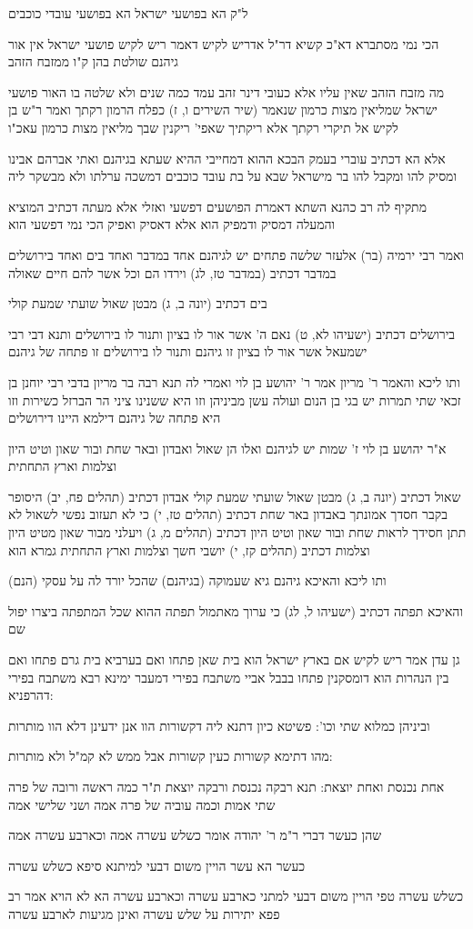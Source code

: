 \documentclass[12pt, openany]{book}
\newcommand{\sethebfont}{
\fontsize{10.5pt}{21.0pt} \selectfont
}
\newcommand{\textblock}[1]{
{\sethebfont #1\\}	
}
\begin{document}
\textblock{ל"ק הא בפושעי ישראל הא בפושעי עובדי כוכבים}
\textblock{הכי נמי מסתברא דא"כ קשיא דר"ל אדריש לקיש דאמר ריש לקיש פושעי ישראל אין אור גיהנם שולטת בהן ק"ו ממזבח הזהב}
\textblock{מה מזבח הזהב שאין עליו אלא כעובי דינר זהב עמד כמה שנים ולא שלטה בו האור פושעי ישראל שמליאין מצות כרמון שנאמר (שיר השירים ו, ז) כפלח הרמון רקתך ואמר ר"ש בן לקיש אל תיקרי רקתך אלא ריקתיך שאפי' ריקנין שבך מליאין מצות כרמון עאכ"ו}
\textblock{אלא הא דכתיב עוברי בעמק הבכא ההוא דמחייבי ההיא שעתא בגיהנם ואתי אברהם אבינו ומסיק להו ומקבל להו בר מישראל שבא על בת עובד כוכבים דמשכה ערלתו ולא מבשקר ליה}
\textblock{מתקיף לה רב כהנא השתא דאמרת הפושעים דפשעי ואזלי אלא מעתה דכתיב המוציא והמעלה דמסיק ודמפיק הוא אלא דאסיק ואפיק הכי נמי דפשעי הוא}
\textblock{ואמר רבי ירמיה (בר) אלעזר שלשה פתחים יש לגיהנם אחד במדבר ואחד בים ואחד בירושלים במדבר דכתיב (במדבר טז, לג) וירדו הם וכל אשר להם חיים שאולה}
\textblock{בים דכתיב (יונה ב, ג) מבטן שאול שועתי שמעת קולי}
\textblock{בירושלים דכתיב (ישעיהו לא, ט) נאם ה' אשר אור לו בציון ותנור לו בירושלים ותנא דבי רבי ישמעאל אשר אור לו בציון זו גיהנם ותנור לו בירושלים זו פתחה של גיהנם}
\textblock{ותו ליכא והאמר ר' מריון אמר ר' יהושע בן לוי ואמרי לה תנא רבה בר מריון בדבי רבי יוחנן בן זכאי שתי תמרות יש בגי בן הנום ועולה עשן מביניהן וזו היא ששנינו ציני הר הברזל כשירות וזו היא פתחה של גיהנם דילמא היינו דירושלים}
\textblock{א"ר יהושע בן לוי ז' שמות יש לגיהנם ואלו הן שאול ואבדון ובאר שחת ובור שאון וטיט היון וצלמות וארץ התחתית}
\textblock{שאול דכתיב (יונה ב, ג) מבטן שאול שועתי שמעת קולי אבדון דכתיב (תהלים פח, יב) היסופר בקבר חסדך אמונתך באבדון באר שחת דכתיב (תהלים טז, י) כי לא תעזוב נפשי לשאול לא תתן חסידך לראות שחת ובור שאון וטיט היון דכתיב (תהלים מ, ג) ויעלני מבור שאון מטיט היון וצלמות דכתיב (תהלים קז, י) יושבי חשך וצלמות וארץ התחתית גמרא הוא}
\textblock{ותו ליכא והאיכא גיהנם גיא שעמוקה (בגיהנם) שהכל יורד לה על עסקי (הנם)}
\textblock{והאיכא תפתה דכתיב (ישעיהו ל, לג) כי ערוך מאתמול תפתה ההוא שכל המתפתה ביצרו יפול שם}
\textblock{גן עדן אמר ריש לקיש אם בארץ ישראל הוא בית שאן פתחו ואם בערביא בית גרם פתחו ואם בין הנהרות הוא דומסקנין פתחו בבבל אביי משתבח בפירי דמעבר ימינא רבא משתבח בפירי דהרפניא:}
\textblock{וביניהן כמלוא שתי וכו': פשיטא כיון דתנא ליה דקשורות הוו אנן ידעינן דלא הוו מותרות}
\textblock{מהו דתימא קשורות כעין קשורות אבל ממש לא קמ"ל ולא מותרות:}
\textblock{אחת נכנסת ואחת יוצאת: תנא רבקה נכנסת ורבקה יוצאת ת"ר כמה ראשה ורובה של פרה שתי אמות וכמה עוביה של פרה אמה ושני שלישי אמה}
\textblock{שהן כעשר דברי ר"מ ר' יהודה אומר כשלש עשרה אמה וכארבע עשרה אמה}
\textblock{כעשר הא עשר הויין משום דבעי למיתנא סיפא כשלש עשרה}
\textblock{כשלש עשרה טפי הויין משום דבעי למתני כארבע עשרה וכארבע עשרה הא לא הויא אמר רב פפא יתירות על שלש עשרה ואינן מגיעות לארבע עשרה}
\end{document}
